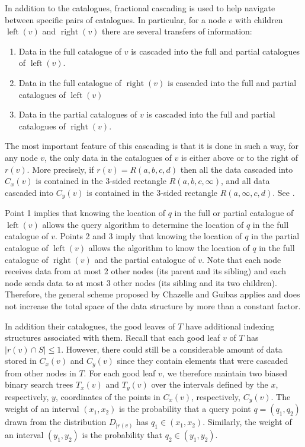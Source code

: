 \documentclass[lotsofwhite,charterfonts]{patmorin}
\DeclareMathOperator{\lft}{left}
\DeclareMathOperator{\rght}{right}
\begin{document}
In addition to the catalogues, fractional cascading \cite{X} is used
to help navigate between specific pairs of catalogues.  In particular,
for a node $v$ with children $\lft(v)$ and $\rght(v)$ there are several 
transfers of information:

\begin{enumerate}

\item Data in the full catalogue of $v$ is cascaded into the full and
partial catalogues of $\lft(v)$.

\item Data in the full catalogue of $\rght(v)$ is cascaded into the
full and partial catalogues of $\lft(v)$

\item Data in the partial catalogues of $v$ is cascaded into the full
and partial catalogues of $\rght(v)$.

\end{enumerate} 

The most important feature of this cascading is that it is done in
such a way, for any node $v$, the only data in the catalogues of $v$
is either above or to the right of $r(v)$.  More precisely, if
$r(v)=R(a,b,c,d)$ then all the data cascaded into $C_x(v)$ is
contained in the 3-sided rectangle $R(a,b,c,\infty)$, and all data
cascaded into $C_y(v)$ is contained in the 3-sided rectangle
$R(a,\infty,c,d)$.  See .

Point 1 implies that knowing the location of $q$ in the full or
partial catalogue of $\lft(v)$ allows the query algorithm to determine
the location of $q$ in the full catalogue of $v$.  Points 2 and 3
imply that knowing the location of $q$ in the partial catalogue of
$\lft(v)$ allows the algorithm to know the location of $q$ in the full
catalogue of $\rght(v)$ and the partial catalogue of $v$.  Note that
each node receives data from at most 2 other nodes (its parent and its
sibling) and each node sends data to at most 3 other nodes (its
sibling and its two children). Therefore, the general scheme proposed
by Chazelle and Guibas applies and does not increase the total space
of the data structure by more than a constant factor.

In addition their catalogues, the good leaves of $T$ have additional
indexing structures associated with them.  Recall that each good leaf
$v$ of $T$ has $|r(v)\cap S| \le 1$. However, there could still be a
considerable amount of data stored in $C_x(v)$ and $C_y(v)$ since they
contain elements that were cascaded from other nodes in $T$.  For each
good leaf $v$, we therefore maintain two biased binary search trees
$T_x(v)$ and $T_y(v)$ over the intervals defined by the $x$,
respectively, $y$, coordinates of the points in $C_x(v)$,
respectively, $C_y(v)$.  The weight of an interval $(x_1,x_2)$ is the
probability that a query point $q=(q_1,q_2)$ drawn from the
distribution $D_{\mid r(v)}$ has $q_1\in(x_1,x_2)$.   Similarly, the
weight of an interval $(y_1,y_2)$ is the probability that $q_2\in
(y_1,y_2)$.
\end{document}
